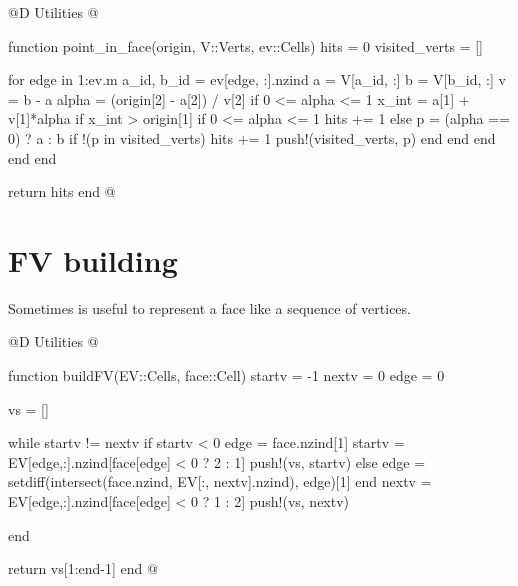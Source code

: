 @D Utilities
@{function point_in_face(origin, V::Verts, ev::Cells)
    hits = 0
    visited_verts = []

    for edge in 1:ev.m
        a_id, b_id = ev[edge, :].nzind
        a = V[a_id, :]
        b = V[b_id, :]
        v = b - a
        alpha = (origin[2] - a[2]) / v[2]
        if 0 <= alpha <= 1
            x_int = a[1] + v[1]*alpha
            if x_int > origin[1]
                if 0 <= alpha <= 1
                    hits += 1
                else
                    p = (alpha == 0) ? a : b
                    if !(p in visited_verts)
                        hits += 1
                        push!(visited_verts, p)
                    end
                end
            end
        end
    end

    return hits %
end
@}


\section{FV building}

Sometimes is useful to represent a face like a sequence of vertices.

@D Utilities
@{function buildFV(EV::Cells, face::Cell)
    startv = -1
    nextv = 0
    edge = 0

    vs = []

    while startv != nextv
        if startv < 0
            edge = face.nzind[1]
            startv = EV[edge,:].nzind[face[edge] < 0 ? 2 : 1]
            push!(vs, startv)
        else
            edge = setdiff(intersect(face.nzind, EV[:, nextv].nzind), edge)[1]
        end
        nextv = EV[edge,:].nzind[face[edge] < 0 ? 1 : 2]
        push!(vs, nextv)

    end

    return vs[1:end-1]
end
@}